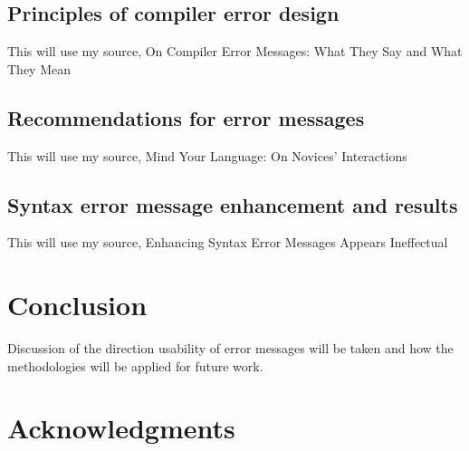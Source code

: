 \documentclass{sig-alternate}
\begin{document}
\subsection{Principles of compiler error design}
This will use my source, On Compiler Error Messages: What They Say and What They Mean

\subsection{Recommendations for error messages}
This will use my source, Mind Your Language: On Novices’ Interactions 

\subsection{Syntax error message enhancement and results}
This will use my source, Enhancing Syntax Error Messages Appears Ineffectual


\section{Conclusion}
Discussion of the direction usability of error messages will be taken and how the methodologies will be applied for future work.



\section{Acknowledgments}




  
\end{document}
